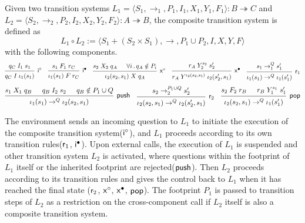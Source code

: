 \documentclass[acmsmall,review,anonymous]{acmart}\settopmatter{printfolios=true,printccs=false,printacmref=false}
\begin{document}
\begin{definition} \label{def:lts-comp}
Given two transition systems
$L_1 = \langle S_1, {\rightarrow_1}, P_1, I_1, X_1, Y_1, F_1 \rangle
: B \twoheadrightarrow C$ and
$L_2 = \langle S_2, {\rightarrow_2}, P_2, I_2, X_2, Y_2, F_2 \rangle
: A \twoheadrightarrow B$,
the composite transition system is defined as
\[
  L_1 \circ L_2 :=
  \langle S_1 + (S_2 \times S_1), {\rightarrow}, P_1 \cup P_2, I, X, Y, F \rangle
\]
with the following components.
\[
  \begin{prooftree}
    \hypo{q_C \mathrel{I_1} s_1}
    \infer1[$\kw{i}^\circ$]{q_C \mathrel{I} \iota_1(s_1)}
  \end{prooftree}
  \quad
  \begin{prooftree}
    \hypo{s_1 \mathrel{F_1} r_C}
    \infer1[$\kw{i}^\bullet$]{\iota_1(s_1) \mathrel{F} r_C}
  \end{prooftree}
  \quad
  \begin{prooftree}
    \hypo{s_2 \mathrel{X_2} q_A}
    \hypo{\forall i\,.\, q_A \notin P_i}
    \infer2[$\kw{x}^\circ$]{\iota_2(s_2, s_1) \mathrel{X} q_A}
  \end{prooftree}
  \quad
  \begin{prooftree}
    \hypo{r_A \mathrel{Y_2^{s_2}} s_2'}
    \infer1[$\kw{x}^\bullet$]{r_A \mathrel{Y^{\iota_2(s_2, s_1)}} \iota_2(s_2', s_1)}
  \end{prooftree}
  \quad
  \begin{prooftree}
    \hypo{s_1 \rightarrow_1^Q s_1'}
    \infer1[$\kw{r}_1$]{\iota_1(s_1) \rightarrow^Q \iota_1(s_1')}
  \end{prooftree}
\]
\[
  \begin{prooftree}
    \hypo{s_1 \mathrel{X_1} q_B}
    \hypo{q_B \mathrel{I_2} s_2}
    \hypo{q_B \notin P_1 \cup Q}
    \infer3[\kw{push}]{\iota_1(s_1) \rightarrow^Q \iota_2(s_2, s_1)}
  \end{prooftree}
  \quad
  \begin{prooftree}
    \hypo{s_2 \rightarrow_2^{P_1 \cup Q} s_2'}
    \infer1[$\kw{r}_2$]{\iota_2(s_2, s_1) \rightarrow^Q \iota_2(s_2', s_1)}
  \end{prooftree}
  \quad
  \begin{prooftree}
    \hypo{s_2 \mathrel{F_2} r_B}
    \hypo{r_B \mathrel{Y_1^{s_1}} s_1'}
    \infer2[\kw{pop}]{\iota_2(s_2, s_1) \rightarrow^Q \iota_1(s_1')}
  \end{prooftree}
\]
\end{definition}
The environment sends an incoming question to $L_1$ to initiate the execution of
the composite transition system($ \mathsf{i} ^\circ$), and $L_1$ proceeds according to
its own transition rules($ \mathsf{r} _1$, $ \mathsf{i} ^\bullet$). Upon external calls, the
execution of $L_1$ is suspended and other transition system $L_2$ is activated,
where questions within the footprint of $L_1$ itself or the inherited footprint
are rejected($ \mathsf{push} $). Then $L_2$ proceeds according to its transition rules
and gives the control back to $L_1$ when it has reached the final state
($ \mathsf{r} _2$, $ \mathsf{x} ^\circ$, $ \mathsf{x} ^\bullet$, $ \mathsf{pop} $). The footprint $P_1$
is passed to transition steps of $L_2$ as a restriction on the cross-component
call if $L_2$ itself is also a composite transition system.
\end{document}
